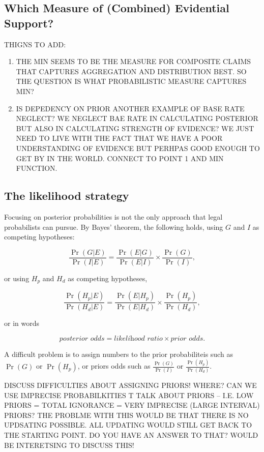 \documentclass[
  10pt,
  dvipsnames,enabledeprecatedfontcommands]{scrartcl}
\begin{document}
\hypertarget{which-measure-of-combined-evidential-support}{%
\subsection{Which Measure of (Combined) Evidential
Support?}\label{which-measure-of-combined-evidential-support}}

THIGNS TO ADD:

\begin{enumerate}
\def\labelenumi{\arabic{enumi}.}
\item
  THE MIN SEEMS TO BE THE MEASURE FOR COMPOSITE CLAIMS THAT CAPTURES
  AGGREGATION AND DISTRIBUTION BEST. SO THE QUESTION IS WHAT
  PROBABILISTIC MEASURE CAPTURES MIN?
\item
  IS DEPEDENCY ON PRIOR ANOTHER EXAMPLE OF BASE RATE NEGLECT? WE NEGLECT
  BAE RATE IN CALCULATING POSTERIOR BUT ALSO IN CALCULATING STRENGTH OF
  EVIDENCE? WE JUST NEED TO LIVE WITH THE FACT THAT WE HAVE A POOR
  UNDERSTANDING OF EVIDENCE BUT PERHPAS GOOD ENOUGH TO GET BY IN THE
  WORLD. CONNECT TO POINT 1 AND MIN FUNCTION.
\end{enumerate}

\hypertarget{the-likelihood-strategy}{%
\subsection{The likelihood strategy}\label{the-likelihood-strategy}}

Focusing on posterior probabilities is not the only approach that legal
probabilists can pursue. By Bayes' theorem, the following holds, using
\(G\) and \(I\) as competing hypotheses:

\[ \frac{\Pr(G \vert E)}{\Pr(I \vert E)} = \frac{\Pr(E \vert G)}{\Pr(E \vert I)} \times \frac{\Pr(G)}{\Pr(I)},\]

or using \(H_p\) and \(H_d\) as competing hypotheses,

\[ \frac{\Pr(H_p \vert E)}{\Pr(H_d \vert E)} = \frac{\Pr(E \vert H_p)}{\Pr(E \vert H_d)} \times \frac{\Pr(H_p)}{\Pr(H_d)},\]

or in words

\[ \textit{posterior odds} = \textit{likelihood ratio} \times \textit{prior odds}.\]

A difficult problem is to assign numbers to the prior probabiliteis such
as \(\Pr(G)\) or \(\Pr(H_p)\), or priors odds such as
\(\frac{\Pr(G)}{\Pr(I)}\) or \(\frac{\Pr(H_p)}{\Pr(H_d)}\).

DISCUSS DIFFICULTIES ABOUT ASSIGNING PRIORS! WHERE? CAN WE USE IMPRECISE
PROBABILKITIES T TALK ABOUT PRIORS -- I.E. LOW PRIORS = TOTAL IGNORANCE
= VERY IMPRECISE (LARGE INTERVAL) PRIORS? THE PROBLME WITH THIS WOULD BE
THAT THERE IS NO UPDSATING POSSIBLE. ALL UPDATING WOULD STILL GET BACK
TO THE STARTING POINT. DO YOU HAVE AN ANSWER TO THAT? WOULD BE
INTERETSING TO DISCUSS THIS!
\end{document}
